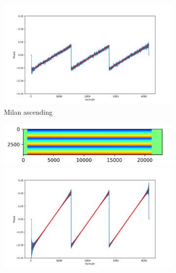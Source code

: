 \documentclass[preprint, authoryear]{elsarticle}
\begin{document}
\begin{figure}
\begin{subfigure}{0.5\textwidth}
\begin{minipage}{0.5\textwidth}
            \centering
            \includegraphics[width=\textwidth]{figure/The cross-interferogram/cross_interf_Milan_asc_row&fitted_20230104.png}
        \end{minipage}
        \caption{Milan ascending}
        \label{fig_5f}
    \end{subfigure}%
    \begin{subfigure}{0.5\textwidth}
        \centering
        \begin{minipage}{0.5\textwidth}
            \centering
            \includegraphics[width=\textwidth]{figure/The cross-interferogram/cross_interf_Milan_des.png}
        \end{minipage}%
        \begin{minipage}{0.5\textwidth}
            \centering
            \includegraphics[width=\textwidth]{figure/The cross-interferogram/cross_interf_Milan_des_row&fitted_20230108.png}

\end{minipage}
\end{subfigure}
\end{figure}
\end{document}
